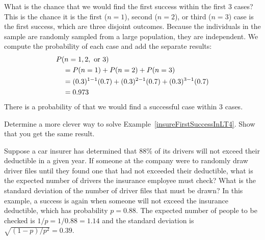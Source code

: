 \begin{examplewrap}
\begin{nexample}{What is the chance that we would find
    the first success within the first 3 cases?}
  \label{insureFirstSuccessInLT4}%
  This is the chance it is the first ($n=1$), second ($n=2$),
  or third ($n=3$) case is the first success, which are three
  disjoint outcomes.
  Because the individuals in the sample are randomly sampled
  from a large population, they are independent.
  We compute the probability of each case and add the separate
  results:
  \begin{align*}
  &P(n=1, 2, \text{ or }3) \\
    & \quad = P(n=1)+P(n=2)+P(n=3) \\
    & \quad = (0.3{})^{1-1}(0.7{})
        + (0.3{})^{2-1}(0.7{})
        + (0.3{})^{3-1}(0.7{}) \\
    & \quad = 0.973{}
  \end{align*}
  There is a probability of \insureCDistC{} that we would
  find a successful case within 3 cases.
\end{nexample}
\end{examplewrap}

\begin{exercisewrap}
\begin{nexercise}
Determine a more clever way to solve Example~\ref{insureFirstSuccessInLT4}.
Show that you get the same result.\footnotemark{}
\end{nexercise}
\end{exercisewrap}

\begin{examplewrap}
\begin{nexample}{Suppose a car insurer has determined
    that 88\% of its drivers will not exceed their deductible
    in a given year.
    If someone at the company were to randomly draw
    driver files until they found one that had not exceeded
    their deductible, what is the expected number of drivers
    the insurance employee must check?
    What is the standard deviation of the number of driver files
    that must be drawn?}
  \label{carInsure08DrawOne}%
  In this example, a success is again when someone will not
  exceed the insurance deductible, which has probability
  $p = 0.88$.
  The expected number of people to be checked is
  $1 / p = 1 / 0.88 = 1.14$ and the standard deviation is
  $\sqrt{(1-p)/p^2} = 0.39$.
\end{nexample}
\end{examplewrap}

